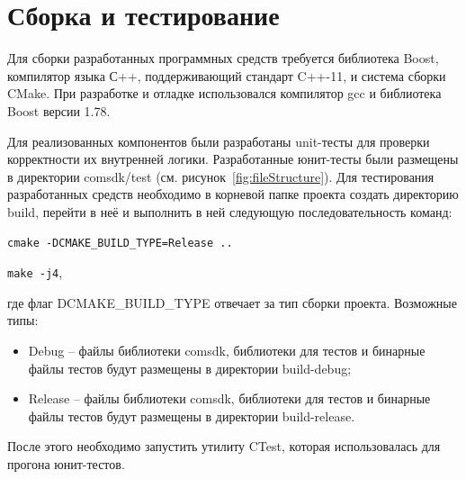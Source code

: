 \section{Сборка и тестирование}
Для сборки разработанных программных средств требуется библиотека Boost, компилятор языка С++, поддерживающий стандарт C++-11, и система сборки CMake. При разработке и отладке использовался компилятор gcc и библиотека Boost версии 1.78.

Для реализованных компонентов были разработаны unit-тесты для проверки корректности их внутренней логики. Разработанные юнит-тесты были размещены в директории comsdk/test (см. рисунок~\ref{fig:fileStructure}).
Для тестирования разработанных средств необходимо в корневой папке проекта создать директорию build, перейти в неё и выполнить в ней следующую последовательность команд:

\texttt{cmake -DCMAKE_BUILD_TYPE=Release ..}

\texttt{make -j4},

где флаг \textsf{DCMAKE_BUILD_TYPE} отвечает за тип сборки проекта. Возможные типы:
\begin{itemize}
    \item Debug -- файлы библиотеки comsdk, библиотеки для тестов и бинарные файлы тестов будут размещены в директории build-debug;
    \item Release -- файлы библиотеки comsdk, библиотеки для тестов и бинарные файлы тестов будут размещены в директории build-release.
\end{itemize}

После этого необходимо запустить утилиту CTest, которая использовалась для прогона юнит-тестов.